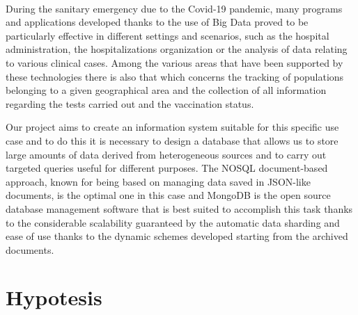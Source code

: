 \documentclass[a4paper,12pt]{article}
\begin{document}
\paragraph{}During the sanitary emergency due to the Covid-19 pandemic, many programs and applications developed thanks to the use of Big Data proved to be particularly effective in different settings and scenarios, such as the hospital administration, the hospitalizations organization or the analysis of data relating to various clinical cases. Among the various areas that have been supported by these technologies there is also that which concerns the tracking of populations belonging to a given geographical area and the collection of all information regarding the tests carried out and the vaccination status. \par
Our project aims to create an information system suitable for this specific use case and to do this it is necessary to design a database that allows us to store large amounts of data derived from heterogeneous sources and to carry out targeted queries useful for different purposes. The NOSQL document-based approach, known for being based on managing data saved in JSON-like documents, is the optimal one in this case and MongoDB is the open source database management software that is best suited to accomplish this task thanks to the considerable scalability guaranteed by the automatic data sharding and ease of use thanks to the dynamic schemes developed starting from the archived documents.
\section{Hypotesis}
\end{document}

